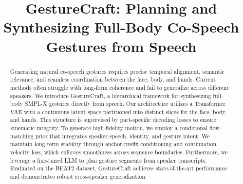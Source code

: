 \documentclass[sigconf,anonymous,review]{acmart}
\begin{document}
\title{GestureCraft: Planning and Synthesizing Full-Body Co-Speech Gestures from Speech}



\begin{abstract}
Generating natural co-speech gestures requires precise temporal alignment, semantic relevance, and seamless coordination between the face, body, and hands.
Current methods often struggle with long-form coherence and fail to generalize across different speakers.
We introduce GestureCraft, a hierarchical framework for synthesizing full-body SMPL-X gestures directly from speech.
Our architecture utilizes a Transformer VAE with a continuous latent space partitioned into distinct slices for the face, body, and hands.
This structure is supervised by part-specific decoding losses to ensure kinematic integrity.
To generate high-fidelity motion, we employ a conditional flow-matching prior that integrates speaker speech, identity, and gesture intent.
We maintain long-term stability through anchor-prefix conditioning and continuation velocity loss, which enforces smoothness across sequence boundaries.
Furthermore, we leverage a fine-tuned LLM to plan gesture segments from speaker transcripts.
Evaluated on the BEAT2 dataset, GestureCraft achieves state-of-the-art performance and demonstrates robust cross-speaker generalization.
\end{abstract}
\end{document}

